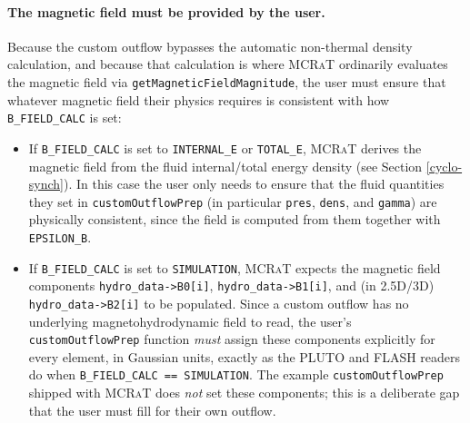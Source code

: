 \documentclass[12pt,a4paper]{article}
\newcommand{\mcrat}{\textsc{MCRaT}}
\begin{document}
\paragraph{The magnetic field must be provided by the user.}
Because the custom outflow bypasses the automatic non-thermal density calculation, and because that calculation is where \mcrat{} ordinarily evaluates the magnetic field via \texttt{getMagneticFieldMagnitude}, the user must ensure that whatever magnetic field their physics requires is consistent with how \texttt{B\_FIELD\_CALC} is set:
\begin{itemize}
	\item If \texttt{B\_FIELD\_CALC} is set to \texttt{INTERNAL\_E} or \texttt{TOTAL\_E}, \mcrat{} derives the magnetic field from the fluid internal/total energy density (see Section \ref{cyclo-synch}). In this case the user only needs to ensure that the fluid quantities they set in \texttt{customOutflowPrep} (in particular \texttt{pres}, \texttt{dens}, and \texttt{gamma}) are physically consistent, since the field is computed from them together with \texttt{EPSILON\_B}.
	\item If \texttt{B\_FIELD\_CALC} is set to \texttt{SIMULATION}, \mcrat{} expects the magnetic field components \texttt{hydro\_data->B0[i]}, \texttt{hydro\_data->B1[i]}, and (in 2.5D/3D) \texttt{hydro\_data->B2[i]} to be populated. Since a custom outflow has no underlying magnetohydrodynamic field to read, the user's \texttt{customOutflowPrep} function \emph{must} assign these components explicitly for every element, in Gaussian units, exactly as the PLUTO and FLASH readers do when \texttt{B\_FIELD\_CALC == SIMULATION}. The example \texttt{customOutflowPrep} shipped with \mcrat{} does \emph{not} set these components; this is a deliberate gap that the user must fill for their own outflow.
\end{itemize}
\end{document}
